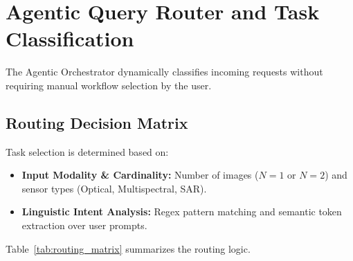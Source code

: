 \documentclass[12pt,a4paper]{report}
\begin{document}
\section{Agentic Query Router and Task Classification}
The Agentic Orchestrator dynamically classifies incoming requests without requiring manual workflow selection by the user.

\subsection{Routing Decision Matrix}
Task selection is determined based on:
\begin{itemize}
    \item \textbf{Input Modality \& Cardinality:} Number of images ($N=1$ or $N=2$) and sensor types (Optical, Multispectral, SAR).
    \item \textbf{Linguistic Intent Analysis:} Regex pattern matching and semantic token extraction over user prompts.
\end{itemize}

Table~\ref{tab:routing_matrix} summarizes the routing logic.

\begin{table}[htbp]
\centering
\caption{Agentic Task Routing and Workflow Dispatch Matrix}\label{tab:routing_matrix}
\end{table}
\end{document}
